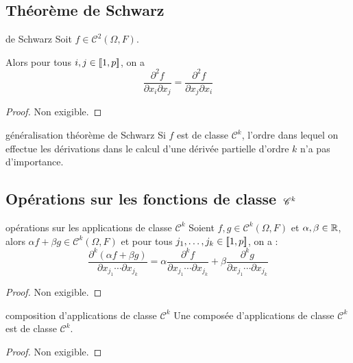 \subsection{Théorème de Schwarz}

\begin{theoreme}{de Schwarz}{}
    Soit $f \in \mathscr C^2(\Omega, F)$.

    Alors pour tous $i, j \in [\![1, p]\!]$, on a 
    $$\frac{\partial^2 f}{\partial x_i \partial x_j} = \frac{\partial^2 f}{\partial x_j \partial x_i}$$
\end{theoreme}

\begin{proof}
    Non exigible.
\end{proof}

\begin{corollaire}{généralisation théorème de Schwarz}{}
    Si $f$ est de classe $\mathscr C^k$, l'ordre dans lequel on effectue les dérivations 
    dans le calcul d'une dérivée partielle d'ordre $k$ n'a pas d'importance.
\end{corollaire}

\subsection{Opérations sur les fonctions de classe \texorpdfstring{$\,\mathscr C^{k}$}{Ck}}

\begin{proposition}{opérations sur les applications de classe $\mathscr C^k$}{}
    Soient $f, g \in \mathscr C^k(\Omega, F)$ et $\alpha, \beta \in \mathbb{R}$, alors 
    $\alpha f + \beta g \in \mathscr C^k(\Omega, F)$ et pour tous 
    $j_1, \ldots, j_k \in [\![1, p]\!]$, on a :
    $$\frac{\partial^k (\alpha f + \beta g)}{\partial x_{j_1} \cdots \partial x_{j_k}} = \alpha \frac{\partial^k f}{\partial x_{j_1} \cdots \partial x_{j_k}} + \beta \frac{\partial^k g}{\partial x_{j_1} \cdots \partial x_{j_k}}$$
\end{proposition}

\begin{proof}
    Non exigible. 
\end{proof}

\begin{proposition}{composition d'applications de classe $\mathscr C^k$}{}
    Une composée d'applications de classe $\mathscr C^k$ est de classe $\mathscr C^k$.
\end{proposition}

\begin{proof}
    Non exigible.
\end{proof}

